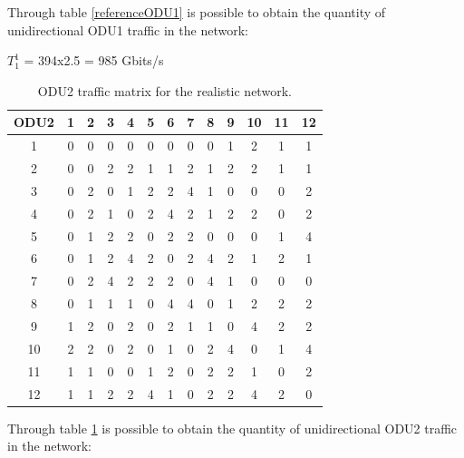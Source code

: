 Through table \ref{referenceODU1} is possible to obtain the quantity of unidirectional ODU1 traffic in the network:

$T_1^1$ = 394x2.5 = 985 Gbits/s \qquad
\vspace{11pt}
\begin{table}[H]
\centering
\begin{tabular}{|c|c|c|c|c|c|c|c|c|c|c|c|c|}
\hline
\textbf{ODU2} & 1 & 2 & 3 & 4 & 5 & 6 & 7 & 8 & 9 & 10 & 11 & 12 \\ \hline
1 & 0 & 0 & 0 & 0 & 0 & 0 & 0 & 0 & 1 & 2 & 1 & 1 \\ \hline
2 & 0 & 0 & 2 & 2 & 1 & 1 & 2 & 1 & 2 & 2 & 1 & 1 \\ \hline
3 & 0 & 2 & 0 & 1 & 2 & 2 & 4 & 1 & 0 & 0 & 0 & 2 \\ \hline
4 & 0 & 2 & 1 & 0 & 2 & 4 & 2 & 1 & 2 & 2 & 0 & 2 \\ \hline
5 & 0 & 1 & 2 & 2 & 0 & 2 & 2 & 0 & 0 & 0 & 1 & 4 \\ \hline
6 & 0 & 1 & 2 & 4 & 2 & 0 & 2 & 4 & 2 & 1 & 2 & 1 \\ \hline
7 & 0 & 2 & 4 & 2 & 2 & 2 & 0 & 4 & 1 & 0 & 0 & 0 \\ \hline
8 & 0 & 1 & 1 & 1 & 0 & 4 & 4 & 0 & 1 & 2 & 2 & 2 \\ \hline
9 & 1 & 2 & 0 & 2 & 0 & 2 & 1 & 1 & 0 & 4 & 2 & 2 \\ \hline
10 & 2 & 2 & 0 & 2 & 0 & 1 & 0 & 2 & 4 & 0 & 1 & 4 \\ \hline
11 & 1 & 1 & 0 & 0 & 1 & 2 & 0 & 2 & 2 & 1 & 0 & 2 \\ \hline
12 & 1 & 1 & 2 & 2 & 4 & 1 & 0 & 2 & 2 & 4 & 2 & 0 \\ \hline
\end{tabular}
\caption{ODU2 traffic matrix for the realistic network.}
\label{referenceODU2}
\end{table}

Through table \ref{referenceODU2} is possible to obtain the quantity of unidirectional ODU2 traffic in the network:

